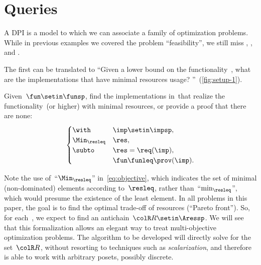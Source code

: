 
\section{Queries}
\label{sec:design-problems-querying}

A DPI is a model to which we can associate a family of optimization problems.
While in previous examples we covered the problem ``feasibility'', we still miss \FixFunMinRes, \FixResMaxFun, and \FeasibleImp.

The first can be translated to ``Given a lower bound on the functionality~\fun, what are the implementations that have minimal resources usage?
''~(\cref{fig:setup-1}).

\begin{problem}[\FixFunMinRes]
\label{prob:FixFunMinRes}
Given~$\fun\setin\funsp$, find the implementations in~\impsp that realize the functionality~\fun (or higher) with minimal resources, or provide a proof that there are none:
\begin{equation}
    \label{eq:objective}
    \begin{cases}
        \with          & \imp\setin\impsp,       \\
        \Min_{\resleq} & \res,                   \\
        \subto         & \res=\req(\imp),        \\
                       & \fun\funleq\prov(\imp).
    \end{cases}
\end{equation}
\end{problem}

\begin{figure*}
    \centering
    \caption{}
    \label{fig:setup-1}
\end{figure*}

\begin{remark}
    Note the use of~``$\Min_{\resleq}$'' in~\cref{eq:objective},
    which indicates the set of minimal (non-dominated) elements according to~$\resleq$, rather than~``$\min_{\resleq}$'', which would presume the existence of the least element.
    In all problems in this paper, the goal is to find the optimal trade-off of resources (``Pareto front'').
    So, for each~\fun, we expect to find an antichain~${\colR R}\setin\Aressp$.
    We will see that this formalization allows an elegant way to treat multi-objective optimization problems.
    The algorithm to be developed will directly solve for the set~${\colR R}$, without resorting to techniques such as \emph{scalarization}, and therefore is able to work with arbitrary posets, possibly discrete.
\end{remark}

